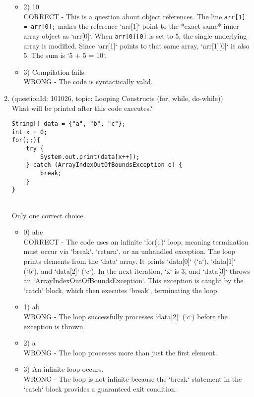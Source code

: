 \documentclass[12pt]{article}
\begin{document}
\begin{enumerate}[label=(\arabic*)]
\begin{itemize}
\item 2) 10
 \\ 
CORRECT - This is a question about object references. The line \verb|arr[1] = arr[0];| makes the reference `arr[1]` point to the *exact same* inner array object as `arr[0]`. When \verb|arr[0][0]| is set to 5, the single underlying array is modified. Since `arr[1]` points to that same array, `arr[1][0]` is also 5. The sum is `5 + 5 = 10`.

\item 3) Compilation fails.
 \\ 
WRONG - The code is syntactically valid.

\end{itemize}
\item (questionId: 101026, topic: Looping Constructs (for, while, do-while)) \\ 
What will be printed after this code executes?\n\begin{verbatim}
String[] data = {"a", "b", "c"};
int x = 0;
for(;;){
    try {
        System.out.print(data[x++]);
    } catch (ArrayIndexOutOfBoundsException e) {
        break;
    }
}
\end{verbatim}
\\ \noindent Only one correct choice. 
\begin{itemize}
\item 0) abc
 \\ 
CORRECT - The code uses an infinite `for(;;)` loop, meaning termination must occur via `break`, `return`, or an unhandled exception. The loop prints elements from the `data` array. It prints `data[0]` (`a`), `data[1]` (`b`), and `data[2]` (`c`). In the next iteration, `x` is 3, and `data[3]` throws an `ArrayIndexOutOfBoundsException`. This exception is caught by the `catch` block, which then executes `break`, terminating the loop.

\item 1) ab
 \\ 
WRONG - The loop successfully processes `data[2]` (`c`) before the exception is thrown.

\item 2) a
 \\ 
WRONG - The loop processes more than just the first element.

\item 3) An infinite loop occurs.
 \\ 
WRONG - The loop is not infinite because the `break` statement in the `catch` block provides a guaranteed exit condition.


\end{itemize}
\end{enumerate}
\end{document}
